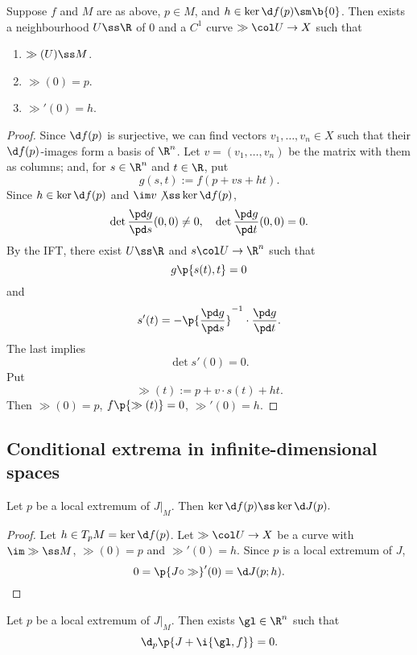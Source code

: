 \begin{theorem}
  Suppose $f$ and $M$ are as above, $p \in M$, and $h \in \ker \d f(p) \sm \b{0}$.
  Then exists a neighbourhood $U \ss \R$ of 0 and a $C^1$ curve $\gg \col U \to X$ such that
  \begin{enumerate}
    \item $\gg(U) \ss M$.
    \item $\gg(0) = p$.
    \item $\gg'(0) = h$.
  \end{enumerate} 
\end{theorem}

\begin{proof}
  Since $\d f(p)$ is surjective, we can find vectors $v_1, \dots, v_n \in X$ such that their $\d f(p)$-images form a basis of $\R^n$. Let $v = (v_1, \dots, v_n)$ be the matrix with them as columns; and, for $s \in \R^n$ and $t \in \R$, put
  $$ g(s, t) := f(p+vs+ht). $$
  Since $h \in \ker \d f(p)$ and $\im v \not \ss \ker \d f(p)$,
  $$ \det \frac{\pd g}{\pd s}(0, 0) \ne 0 , \quad \det \frac{\pd g}{\pd t}(0, 0) = 0. $$
  By the IFT, there exist $U \ss \R$ and $s \col U \to \R^n$ such that
  $$ g\p{s(t), t} = 0 $$
  and
  $$ s'(t) = -  \p{\frac{\pd g}{\pd s}}^{-1} \cdot \frac{\pd g}{\pd t}. $$
  The last implies
  $$ \det s'(0) = 0. $$
  Put
  $$ \gg(t) := p+v \cdot s(t)+ht. $$
  Then $\gg(0) = p$, $f\p{\gg(t)} = 0$, $\gg'(0) = h$.
\end{proof}

\subsection{Conditional extrema in infinite-dimensional spaces}

\begin{lemma}
  Let $p$ be a local extremum of $J|_M$.
  Then $\ker \d f(p) \ss \ker \d J(p).$
\end{lemma}

\begin{proof}
  Let $h \in T_pM = \ker \d f(p)$.
  Let $\gg \col U \to X$ be a curve with $\im \gg \ss M$, $\gg(0) = p$ and $\gg'(0) = h$.
  Since $p$ is a local extremum of $J$,
  $$ 0 = \p{J \circ \gg}'(0) = \d J(p; h). $$
\end{proof}

\begin{theorem}
  Let $p$ be a local extremum of $J|_M$.
  Then exists $\gl \in \R^n$ such that
  $$ \d_p \p{J+\i{\gl, f}} = 0. $$
\end{theorem}

